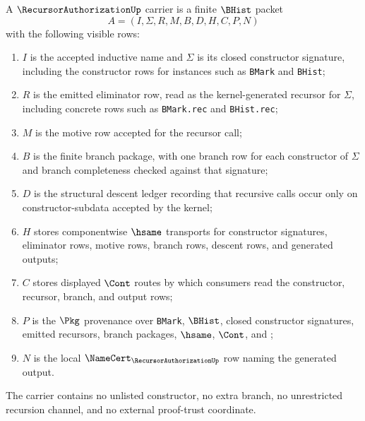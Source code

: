 \begin{definition}
\label{def:recursor-authorization-carrier}
A $\RecursorAuthorizationUp$ carrier is a finite $\BHist$ packet
$$
A=(I,\Sigma,R,M,B,D,H,C,P,N)
$$
with the following visible rows:
\begin{enumerate}
\item $I$ is the accepted inductive name and $\Sigma$ is its closed constructor signature, including the constructor rows for instances such as \texttt{BMark} and \texttt{BHist};
\item $R$ is the emitted eliminator row, read as the kernel-generated recursor for $\Sigma$, including concrete rows such as \texttt{BMark.rec} and \texttt{BHist.rec};
\item $M$ is the motive row accepted for the recursor call;
\item $B$ is the finite branch package, with one branch row for each constructor of $\Sigma$ and branch completeness checked against that signature;
\item $D$ is the structural descent ledger recording that recursive calls occur only on constructor-subdata accepted by the kernel;
\item $H$ stores componentwise $\hsame$ transports for constructor signatures, eliminator rows, motive rows, branch rows, descent rows, and generated outputs;
\item $C$ stores displayed $\Cont$ routes by which consumers read the constructor, recursor, branch, and output rows;
\item $P$ is the $\Pkg$ provenance over \texttt{BMark}, $\BHist$, closed constructor signatures, emitted recursors, branch packages, $\hsame$, $\Cont$, and \NameCert{};
\item $N$ is the local $\NameCert_{\RecursorAuthorizationUp}$ row naming the generated output.
\end{enumerate}
The carrier contains no unlisted constructor, no extra branch, no unrestricted recursion channel, and no external proof-trust coordinate.
\end{definition}

